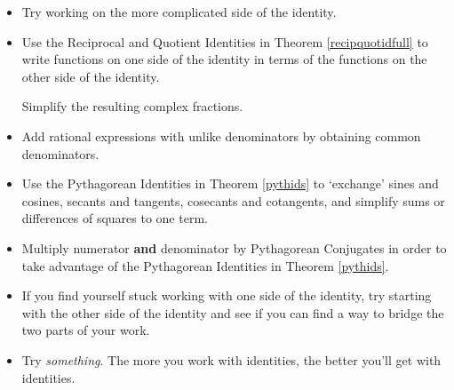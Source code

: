 \documentclass{ximera}
\begin{document}
\begin{itemize}

\item  Try working on the more complicated side of the identity.

\item Use the Reciprocal and Quotient Identities in Theorem \ref{recipquotidfull} to write functions on one side of the identity in terms of the functions on the other side of the identity.  

\smallskip

Simplify the resulting complex fractions.

\item Add rational expressions with unlike denominators by obtaining common denominators.

\item  Use the Pythagorean Identities in Theorem \ref{pythids} to `exchange' sines and cosines, secants and tangents, cosecants and cotangents, and simplify sums or differences of squares to one term. 

\item Multiply numerator \textbf{and} denominator by Pythagorean
Conjugates in order to take advantage of the Pythagorean Identities in  Theorem \ref{pythids}.

\item If you find yourself stuck working with one side of the identity, try starting with the other side of the identity and see if you can find a way to bridge the two parts of your work.

\item  Try \textit{something}.  The more you work with identities, the better you'll get with identities.

\smallskip


\end{itemize}






\closegraphsfile
\end{document}
